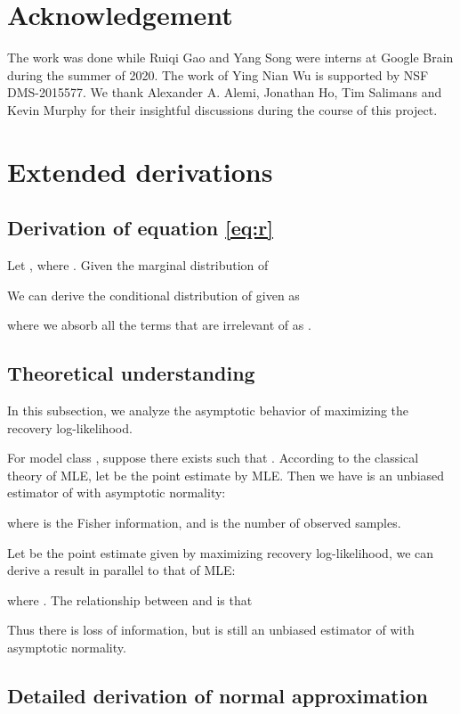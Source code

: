 \documentclass{article} \usepackage{iclr2021_conference,times}
\begin{document}
\section*{Acknowledgement}
The work was done while Ruiqi Gao and Yang Song were interns at Google Brain during the summer of 2020. The work of Ying Nian Wu is supported by NSF DMS-2015577. We thank Alexander A. Alemi, Jonathan Ho, Tim Salimans and Kevin Murphy for their insightful discussions during the course of this project. 




\newpage 
\appendix
\section{Extended derivations}
\subsection{Derivation of equation \ref{eq:r}} \label{app:deri}
Let , where . Given the marginal distribution of 

We can derive the conditional distribution of  given  as

where we absorb all the terms that are irrelevant of  as .

\subsection{Theoretical understanding} \label{app: theo}
In this subsection, we analyze the asymptotic behavior of maximizing the recovery log-likelihood.

For model class , suppose there exists  such that . According to the classical theory of MLE, let  be the point estimate by MLE. Then we have  is an unbiased estimator of  with asymptotic normality: 
 
where   is the Fisher information, and  is the number of observed samples.

Let  be the point estimate given by maximizing recovery log-likelihood, we can derive a result in parallel to that of MLE:

where . 
The relationship between  and  is that

 Thus there is loss of information, but  is still an unbiased estimator of  with asymptotic normality. 
 
 
 \subsection{Detailed derivation of normal approximation} \label{app:normal}
 
\end{document}
